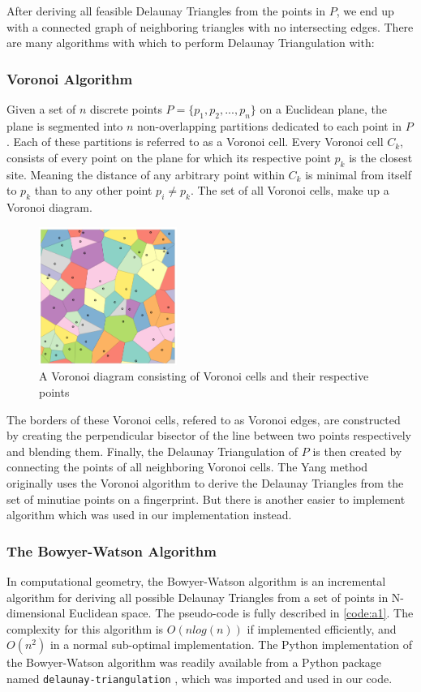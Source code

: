 \documentclass[fyp]{socreport}
\begin{document}
After deriving all feasible Delaunay Triangles from the points in $P$, we end up with a connected graph of neighboring triangles with no intersecting edges. There are many algorithms with which to perform Delaunay Triangulation with:

\subsubsection{Voronoi Algorithm}
Given a set of $n$ discrete points $P = \{p_1, p_2, ..., p_n\}$ on a Euclidean plane, the plane is segmented into $n$ non-overlapping partitions dedicated to each point in $P$. Each of these partitions is referred to as a Voronoi cell.  Every Voronoi cell $C_k$, consists of every point on the plane for which its respective point $p_k$ is the closest site. Meaning the distance of any arbitrary point within $C_k$ is minimal from itself to $p_k$ than to any other point $p_i \ne p_k$. The set of all Voronoi cells, make up a Voronoi diagram.

\begin{figure}[H]
	\centering
	\includegraphics[width=0.4\textwidth]
	{voronoi}
	\caption{A Voronoi diagram consisting of Voronoi cells and their respective points}
\end{figure}

The borders of these Voronoi cells, refered to as Voronoi edges, are constructed by creating the perpendicular bisector of the line between two points respectively and blending them. Finally, the Delaunay Triangulation of $P$ is then created by connecting the points of all neighboring Voronoi cells. The Yang method originally uses the Voronoi algorithm to derive the Delaunay Triangles from the set of minutiae points on a fingerprint. But there is another easier to implement algorithm which was used in our implementation instead.

\subsubsection{The Bowyer-Watson Algorithm}
In computational geometry, the Bowyer-Watson algorithm is an incremental algorithm for deriving all possible Delaunay Triangles from a set of points in N-dimensional Euclidean space. The pseudo-code is fully described in \ref{code:a1}. The complexity for this algorithm is $O(n log(n))$ if implemented efficiently, and $O(n^2)$ in a normal sub-optimal implementation. The Python implementation of the Bowyer-Watson algorithm was readily available from a Python package named \texttt{delaunay-triangulation} \cite{delgit}, which was imported and used in our code.
\end{document}
